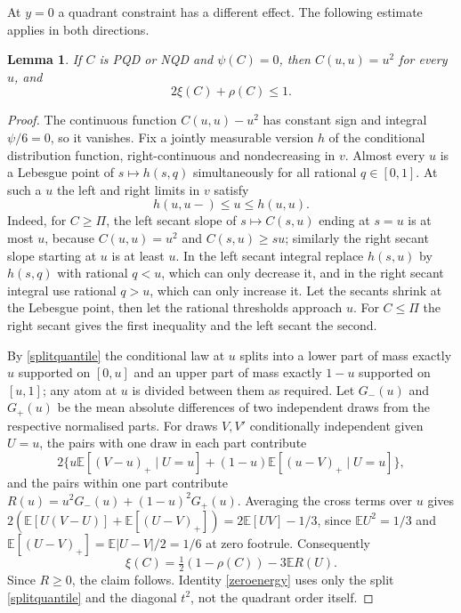 \documentclass[11pt,a4paper]{article}
\newtheorem{lemma}[theorem]{Lemma}
\theoremstyle{remark}
\newcommand{\E}{\mathbb E}
\newcommand{\1}{\mathbf 1}
\begin{document}
At $y=0$ a quadrant constraint has a different effect. The following estimate applies in both directions.
\begin{lemma}\label{touching}
If $C$ is PQD or NQD and $\psi(C)=0$, then $C(u,u)=u^2$ for every $u$, and
\[
                     2\xi(C)+\rho(C)\leq1.
\]
\end{lemma}
\begin{proof}
The continuous function $C(u,u)-u^2$ has constant sign and integral $\psi/6=0$, so it vanishes. Fix a jointly measurable version $h$ of the conditional distribution function, right-continuous and nondecreasing in $v$. Almost every $u$ is a Lebesgue point of $s\mapsto h(s,q)$ simultaneously for all rational $q\in[0,1]$. At such a $u$ the left and right limits in $v$ satisfy
\begin{equation}
                     h(u,u-)\leq u\leq h(u,u).\label{splitquantile}
\end{equation}
Indeed, for $C\ge\Pi$, the left secant slope of $s\mapsto C(s,u)$ ending at $s=u$ is at most $u$, because $C(u,u)=u^2$ and $C(s,u)\ge su$; similarly the right secant slope starting at $u$ is at least $u$. In the left secant integral replace $h(s,u)$ by $h(s,q)$ with rational $q<u$, which can only decrease it, and in the right secant integral use rational $q>u$, which can only increase it. Let the secants shrink at the Lebesgue point, then let the rational thresholds approach $u$. For $C\le\Pi$ the right secant gives the first inequality and the left secant the second.

By \eqref{splitquantile} the conditional law at $u$ splits into a lower part of mass exactly $u$ supported on $[0,u]$ and an upper part of mass exactly $1-u$ supported on $[u,1]$; any atom at $u$ is divided between them as required. Let $G_-(u)$ and $G_+(u)$ be the mean absolute differences of two independent draws from the respective normalised parts. For draws $V,V'$ conditionally independent given $U=u$, the pairs with one draw in each part contribute
\[
 2\{u\E[(V-u)_+\mid U=u]+(1-u)\E[(u-V)_+\mid U=u]\},
\]
and the pairs within one part contribute $R(u)=u^2G_-(u)+(1-u)^2G_+(u)$. Averaging the cross terms over $u$ gives $2(\E[U(V-U)]+\E[(U-V)_+])=2\E[UV]-1/3$, since $\E U^2=1/3$ and $\E[(U-V)_+]=\E|U-V|/2=1/6$ at zero footrule. Consequently
\begin{equation}
               \xi(C)=\tfrac12(1-\rho(C))-3\E R(U).
               \label{zeroenergy}
\end{equation}
Since $R\ge0$, the claim follows. Identity \eqref{zeroenergy} uses only the split \eqref{splitquantile} and the diagonal $t^2$, not the quadrant order itself.
\end{proof}
\end{document}
